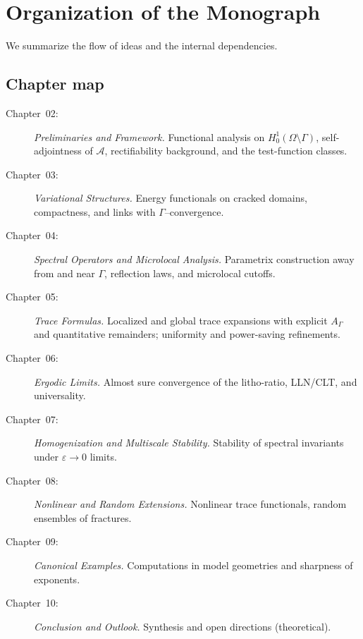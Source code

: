
\section{Organization of the Monograph}
\label{sec:intro-organization}

We summarize the flow of ideas and the internal dependencies.

\subsection{Chapter map}
\label{sub:intro-chapter-map}

\begin{description}
  \item[Chapter~02:] \emph{Preliminaries and Framework.}
  Functional analysis on $H^1_0(\Omega\setminus\Gamma)$, self-adjointness of
  $\mathcal{A}$, rectifiability background, and the test-function classes.
  \item[Chapter~03:] \emph{Variational Structures.}
  Energy functionals on cracked domains, compactness, and links with
  $\Gamma$–convergence.
  \item[Chapter~04:] \emph{Spectral Operators and Microlocal Analysis.}
  Parametrix construction away from and near $\Gamma$, reflection laws,
  and microlocal cutoffs.
  \item[Chapter~05:] \emph{Trace Formulas.}
  Localized and global trace expansions with explicit $A_\Gamma$ and
  quantitative remainders; uniformity and power-saving refinements.
  \item[Chapter~06:] \emph{Ergodic Limits.}
  Almost sure convergence of the litho-ratio, LLN/CLT, and universality.
  \item[Chapter~07:] \emph{Homogenization and Multiscale Stability.}
  Stability of spectral invariants under $\varepsilon\to 0$ limits.
  \item[Chapter~08:] \emph{Nonlinear and Random Extensions.}
  Nonlinear trace functionals, random ensembles of fractures.
  \item[Chapter~09:] \emph{Canonical Examples.}
  Computations in model geometries and sharpness of exponents.
  \item[Chapter~10:] \emph{Conclusion and Outlook.}
  Synthesis and open directions (theoretical).
\end{description}

